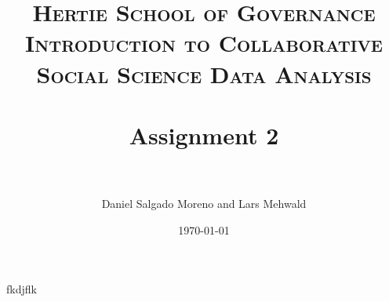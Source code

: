 \documentclass[paper=a4, fontsize=11pt]{scrartcl} %
\title{	
\normalfont \normalsize 
\textsc{Hertie School of Governance \\
Introduction to Collaborative Social Science Data Analysis} \\ [25pt] %
\horrule{0.5pt} \\[0.4cm] %
\huge Assignment 2 \\ %
\horrule{2pt} \\[0.5cm] %
}
\author{Daniel Salgado Moreno and Lars Mehwald} %
\date{\normalsize\today} %
\numberwithin{equation}{section} %
\begin{document}
\maketitle

fkdjflk
\end{document}
